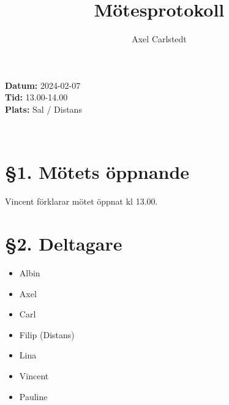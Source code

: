 \documentclass[a4paper, 11pt]{article}
\title{Mötesprotokoll}
\author{Axel Carlstedt}
\begin{document}
\pagestyle{style1}


\textbf{Datum:} 2024-02-07\\
\textbf{Tid:} 13.00-14.00\\
\textbf{Plats:} Sal / Distans

\makebox[\linewidth]{\rule{\linewidth}{0.4pt}}\\

\section*{§1. Mötets öppnande}
Vincent förklarar mötet öppnat kl 13.00.

\section*{§2. Deltagare}
\begin{itemize}
    \item Albin
    \item Axel
    \item Carl
    \item Filip (Distans)
    \item Lina
    \item Vincent
    \item Pauline

\end{itemize}
\end{document}
